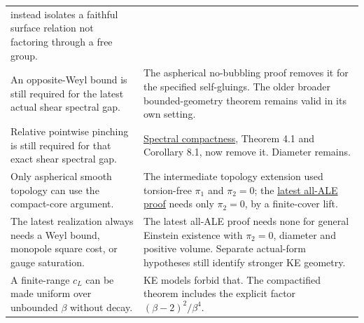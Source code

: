\documentclass[
  10pt,
]{article}
\begin{document}
\begin{longtable}[]{@{}>{\raggedright\arraybackslash}p{\dimexpr(\linewidth-2\tabcolsep)/2\relax}>{\raggedright\arraybackslash}p{\dimexpr(\linewidth-2\tabcolsep)/2\relax}@{}}
\begin{minipage}[t]{0.47\columnwidth}
instead isolates a faithful surface relation not factoring through a
free group.\strut
\end{minipage}\tabularnewline
\begin{minipage}[t]{0.47\columnwidth}\raggedright
An opposite-Weyl bound is still required for the latest actual shear
spectral gap.\strut
\end{minipage} & \begin{minipage}[t]{0.47\columnwidth}\raggedright
The aspherical no-bubbling proof removes it for the specified
self-gluings. The older broader bounded-geometry theorem remains valid
in its own setting.\strut
\end{minipage}\tabularnewline
\begin{minipage}[t]{0.47\columnwidth}\raggedright
Relative pointwise pinching is still required for that exact shear
spectral gap.\strut
\end{minipage} & \begin{minipage}[t]{0.47\columnwidth}\raggedright
\href{../continuation/20260923_allowed_mode_rigidity.md}{Spectral
compactness}, Theorem 4.1 and Corollary 8.1, now remove it. Diameter
remains.\strut
\end{minipage}\tabularnewline
\begin{minipage}[t]{0.47\columnwidth}\raggedright
Only aspherical smooth topology can use the compact-core argument.\strut
\end{minipage} & \begin{minipage}[t]{0.47\columnwidth}\raggedright
The intermediate topology extension used torsion-free \(\pi_1\) and
\(\pi_2=0\); the
\href{../continuation/20260924_ale_boundary_compatibility.md}{latest
all-ALE proof} needs only \(\pi_2=0\), by a finite-cover lift.\strut
\end{minipage}\tabularnewline
\begin{minipage}[t]{0.47\columnwidth}\raggedright
The latest realization always needs a Weyl bound, monopole square cost,
or gauge saturation.\strut
\end{minipage} & \begin{minipage}[t]{0.47\columnwidth}\raggedright
The latest all-ALE proof needs none for general Einstein existence with
\(\pi_2=0\), diameter and positive volume. Separate actual-form
hypotheses still identify stronger KE geometry.\strut
\end{minipage}\tabularnewline
\begin{minipage}[t]{0.47\columnwidth}\raggedright
A finite-range \(c_L\) can be made uniform over unbounded \(\beta\)
without decay.\strut
\end{minipage} & \begin{minipage}[t]{0.47\columnwidth}\raggedright
KE models forbid that. The compactified theorem includes the explicit
factor \((\beta-2)^2/\beta^4\).\strut
\end{minipage}\tabularnewline
\bottomrule
\end{longtable}
\end{document}
